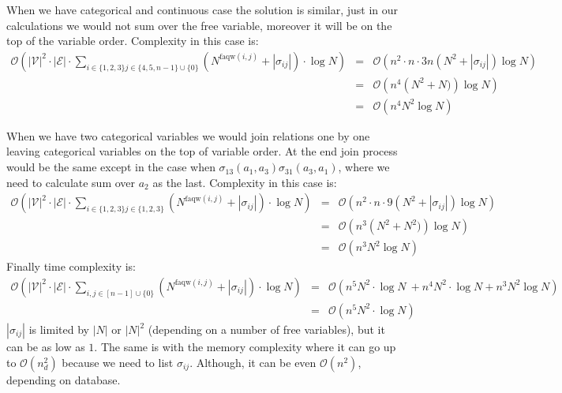 \documentclass[10pt,a4paper]{article}
\begin{document}
\begin{enumerate}
When we have categorical and continuous case the solution is similar, just in our calculations we would not sum over the free variable, moreover it will be on the top of the variable order. Complexity in this case is:
\begin{align*}
\mathcal{O}\left(|\mathcal{V}|^{2} \cdot|\mathcal{E}| \cdot \sum_{i\in\{1, 2, 3\}j \in \{ 4, 5 , n-1\} \cup\{0\}}\left(N^{\mathrm{faqw}(i, j)}+\left|\sigma_{i j}\right|\right) \cdot \log N\right)
&=&
\mathcal{O}\left( n^2 \cdot n \cdot 3n \left(N^2 + \left|\sigma_{i j}\right|\right) \log N \right) \\
&=&  
\mathcal{O}\left( n^4 \left(N^2 + N) \right) \log N \right)\\
&=&  
\mathcal{O}\left( n^4 N^2  \log N \right)
\end{align*}
 
When we have two categorical variables we would join relations one by one leaving categorical variables on the top of variable order. At the end join process would be the same except in the case when $\sigma_{13}(a_1, a_3)\sigma_{31}(a_3, a_1)$, where we need to calculate sum over $a_2$ as the last.   
Complexity in this case is:
\begin{align*}
\mathcal{O}\left(|\mathcal{V}|^{2} \cdot|\mathcal{E}| \cdot \sum_{i\in\{1, 2, 3\}j \in \{ 1, 2, 3\} }\left(N^{\mathrm{faqw}(i, j)}+\left|\sigma_{i j}\right|\right) \cdot \log N\right)
&=&
\mathcal{O}\left( n^2 \cdot n \cdot 9 \left(N^2 + \left|\sigma_{i j}\right|\right) \log N \right) \\
&=&  
\mathcal{O}\left( n^3 \left(N^2 + N^2) \right) \log N \right)\\
&=&  
\mathcal{O}\left( n^3 N^2  \log N \right)
\end{align*}
Finally time complexity is:
\begin{align*}
\mathcal{O}\left(|\mathcal{V}|^{2} \cdot|\mathcal{E}| \cdot \sum_{i, j \in[n-1]\cup\{0\}}\left(N^{\mathrm{faqw}(i, j)}+\left|\sigma_{i j}\right|\right) \cdot \log N\right)
&=&\mathcal{O}\left(n^5 N^{\mathrm{2}}\cdot \log N\ +  n^4 N^{\mathrm{2}}\cdot \log N +  n^3 N^2  \log N \right) \\
&=& \mathcal{O}\left(n^5 N^{\mathrm{2}}\cdot \log N\right) 
\end{align*} 
$|\sigma_{ij}|$ is limited by $|N|$ or $|N|^2$ (depending on a number of free variables), but it can be as low as $1$. 
The same is with the memory complexity where it can go up to $\mathcal{O}(n_d^2)$  because we need to list $\sigma_{ij}$. Although, it can be even $\mathcal{O}(n^2)$, depending on database. 


\end{enumerate}
\end{document}
